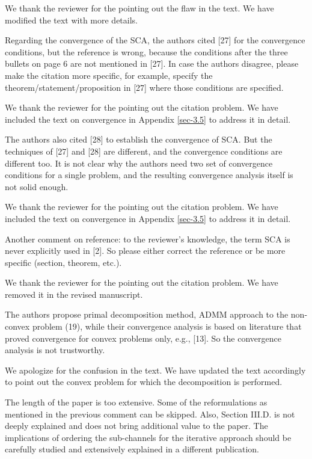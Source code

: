 \resp We thank the reviewer for the pointing out the flaw in the text. We have modified the text with more details.

 Regarding the convergence of the SCA, the authors cited [27] for the convergence conditions, but the reference is wrong, because the conditions after the three bullets on page 6 are not mentioned in [27]. In case the authors disagree, please make the citation more specific, for example, specify the theorem/statement/proposition in [27] where those conditions are specified.

\resp We thank the reviewer for the pointing out the citation problem. We have included the text on convergence in Appendix \ref{sec-3.5} to address it in detail.

 The authors also cited [28] to establish the convergence of SCA. But the techniques of [27] and [28] are different, and the convergence conditions are different too. It is not clear why the authors need two set of convergence conditions for a single problem, and the resulting convergence analysis itself is not solid enough.

\resp We thank the reviewer for the pointing out the citation problem. We have included the text on convergence in Appendix \ref{sec-3.5} to address it in detail.

 Another comment on reference: to the reviewer's knowledge, the term SCA is never explicitly used in [2]. So please either correct the reference or be more specific (section, theorem, etc.).

\resp We thank the reviewer for the pointing out the citation problem. We have removed it in the revised manuscript.

 The authors propose primal decomposition method, ADMM approach to the non-convex problem (19), while their convergence analysis is based on literature that proved convergence for convex problems only, e.g., [13]. So the convergence analysis is not trustworthy.

\resp We apologize for the confusion in the text. We have updated the text accordingly to point out the convex problem for which the decomposition is performed.

 The length of the paper is too extensive. Some of the reformulations as mentioned in the previous comment can be skipped. Also, Section III.D. is not deeply explained and does not bring additional value to the paper. The implications of ordering the sub-channels for the iterative approach should be carefully studied and extensively explained in a different publication.

